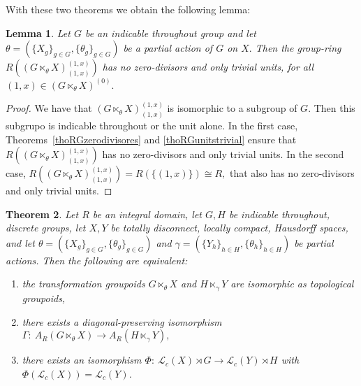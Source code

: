 \documentclass[11pt, a4paper]{amsart}
\newcommand{\Gx}{\ensuremath {G \ltimes_\theta X}}
\newcommand{\Lc}{\ensuremath {\mathcal{L}_c(X)}}
\theoremstyle{plain}
\newtheorem{theorem}{Theorem}[section]
\newtheorem{lemma}[theorem]{Lemma}
\begin{document}
With these two theorems we obtain the following lemma:

\begin{lemma}\label{lemmaindicable}
Let $G$ be an indicable throughout group and let $\theta=(\{X_g\}_{g \in G}, \{\theta_g\}_{g \in G})$ be a partial action of $G$ on $X.$ Then the group-ring $R((\Gx)_{(1,x)}^{(1,x)})$ has no zero-divisors and only trivial units, for all $(1,x) \in (\Gx)^{(0)}.$
\end{lemma}

\begin{proof}
We have that $(\Gx)_{(1,x)}^{(1,x)}$ is isomorphic to a subgroup of $G.$ Then this subgrupo is indicable throughout or the unit alone. In the first case, Theorems~\ref{thoRGzerodivisores} and \ref{thoRGunitstrivial} ensure that $R((\Gx)_{(1,x)}^{(1,x)})$ has no zero-divisors and only trivial units. In the second case, $R((\Gx)_{(1,x)}^{(1,x)})=R(\{(1,x)\}) \cong R,$ that also has no zero-divisors and only trivial units.
\end{proof}



\begin{theorem}\label{theodiagindicable}
Let $R$ be an integral domain, let $G, H$ be indicable throughout, discrete groups, let $X, Y$ be totally disconnect, locally compact, Hausdorff spaces, and let $\theta=(\{X_g\}_{g \in G}, \{\theta_g\}_{g \in G})$ and $\gamma=(\{Y_h\}_{h \in H}, \{\theta_h\}_{h \in H})$ be partial actions. Then the following are equivalent:
\begin{enumerate}[{\rm (i)}]
\item the transformation groupoids $\Gx$ and $H \ltimes_{\gamma} Y$ are isomorphic as topological groupoids,
\item there exists a diagonal-preserving isomorphism $\Gamma: \ A_R(\Gx) \longrightarrow  A_R(H \ltimes_\gamma Y),$ 
\item there exists an isomorphism $\Phi: \ \mathcal{L}_c(X)\rtimes G \longrightarrow \mathcal{L}_c(Y)\rtimes H$ with $\Phi(\Lc) = \mathcal{L}_c(Y)$.
\end{enumerate}
\end{theorem}
\end{document}
